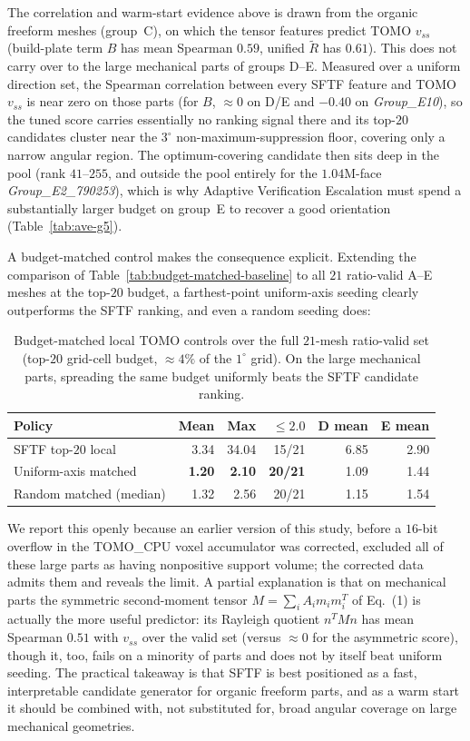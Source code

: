 \documentclass[11pt,a4paper]{article}
\begin{document}
The correlation and warm-start evidence above is drawn from the organic freeform meshes (group~C), on which the tensor features predict TOMO $v_{ss}$ (build-plate term $B$ has mean Spearman $0.59$, unified $\tilde R$ has $0.61$). This does not carry over to the large mechanical parts of groups D--E. Measured over a uniform direction set, the Spearman correlation between every SFTF feature and TOMO $v_{ss}$ is near zero on those parts (for $B$, $\approx 0$ on D/E and $-0.40$ on \emph{Group\_E10}), so the tuned score carries essentially no ranking signal there and its top-$20$ candidates cluster near the $3^\circ$ non-maximum-suppression floor, covering only a narrow angular region. The optimum-covering candidate then sits deep in the pool (rank $41$--$255$, and outside the pool entirely for the $1.04$M-face \emph{Group\_E2\_790253}), which is why Adaptive Verification Escalation must spend a substantially larger budget on group~E to recover a good orientation (Table~\ref{tab:ave-g5}).

A budget-matched control makes the consequence explicit. Extending the comparison of Table~\ref{tab:budget-matched-baseline} to all $21$ ratio-valid A--E meshes at the top-$20$ budget, a farthest-point uniform-axis seeding clearly outperforms the SFTF ranking, and even a random seeding does:

\begin{table}[H]
\centering
\caption{Budget-matched local TOMO controls over the full $21$-mesh ratio-valid set (top-$20$ grid-cell budget, $\approx 4\%$ of the $1^\circ$ grid). On the large mechanical parts, spreading the same budget uniformly beats the SFTF candidate ranking.}
\label{tab:budget-matched-g5}
\small
\begin{tabular}{lrrrrr}
\toprule
Policy & Mean & Max & $\le 2.0$ & D mean & E mean\\
\midrule
SFTF top-$20$ local & 3.34 & 34.04 & 15/21 & 6.85 & 2.90\\
Uniform-axis matched & \textbf{1.20} & \textbf{2.10} & \textbf{20/21} & 1.09 & 1.44\\
Random matched (median) & 1.32 & 2.56 & 20/21 & 1.15 & 1.54\\
\bottomrule
\end{tabular}
\end{table}

We report this openly because an earlier version of this study, before a $16$-bit overflow in the TOMO\_CPU voxel accumulator was corrected, excluded all of these large parts as having nonpositive support volume; the corrected data admits them and reveals the limit. A partial explanation is that on mechanical parts the symmetric second-moment tensor $M=\sum_i A_i m_i m_i^T$ of Eq.~(1) is actually the more useful predictor: its Rayleigh quotient $n^{T}Mn$ has mean Spearman $0.51$ with $v_{ss}$ over the valid set (versus $\approx 0$ for the asymmetric score), though it, too, fails on a minority of parts and does not by itself beat uniform seeding. The practical takeaway is that SFTF is best positioned as a fast, interpretable candidate generator for organic freeform parts, and as a warm start it should be combined with, not substituted for, broad angular coverage on large mechanical geometries.
\end{document}
